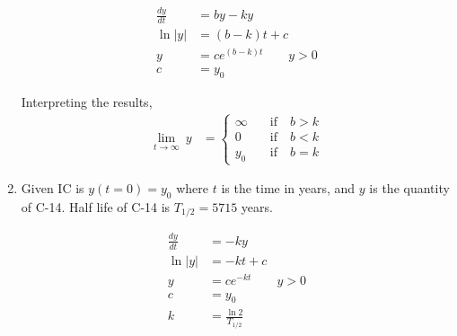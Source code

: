 \begin{enumerate}
          \begin{align}
              \frac{dy}{dt}  & = by - ky                 \\
              \ln        |y| & = (b-k)t + c              \\
              y              & = c e^{(b-k)t} \qquad y>0 \\
              c              & = y_{0}
          \end{align}
          \begin{figure}[H]
              \centering
          \end{figure}
          Interpreting the results,
          \begin{align}
              \lim_{t \to \infty}\ y & =
              \begin{cases}
                  \infty & \quad \mathrm{if} \quad b>k \\
                  0      & \quad \mathrm{if} \quad b<k \\
                  y_{0}  & \quad \mathrm{if} \quad b=k
              \end{cases}
          \end{align}


    \item Given IC is $y(t = 0) = y_{0}$ where $ t $ is the time in years, and $ y $ is the quantity of C-14.
          Half life of C-14 is $ T_{1/2} = 5715 $ years.

          \begin{align}
              \frac{dy}{dt}  & = - ky                  \\
              \ln        |y| & = -kt + c               \\
              y              & = c e^{-kt} \qquad y>0  \\
              c              & = y_{0}                 \\
              k              & = \frac{\ln 2}{T_{1/2}}
          \end{align}


\end{enumerate}
